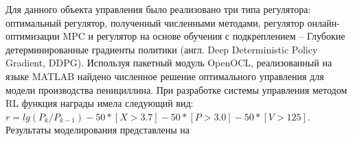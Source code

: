 Для данного объекта управления было реализовано три типа регулятора: оптимальный регулятор, полученный численными методами, регулятор онлайн-оптимизации MPC и регулятор на основе обучения с подкреплением -- Глубокие детерминированные градиенты политики (англ. Deep Deterministic Policy Gradient, DDPG). Используя пакетный модуль OpenOCL, реализованный на языке MATLAB найдено численное решение оптимального управления для модели производства пенициллина. При разработке системы управления методом RL функция награды имела следующий вид: $r = lg(P_k/P_{k-1}) - 50*[X>3.7]-50*[P>3.0]-50*[V>125]$. Результаты моделирования представлены на 
%
\begin{figure}[ht!]  
	\centering 
	\begin{minipage}[h]{0.49\linewidth}
	\end{minipage}
	\hfill
	\begin{minipage}[h]{0.49\linewidth}

\end{minipage}
\end{figure}
